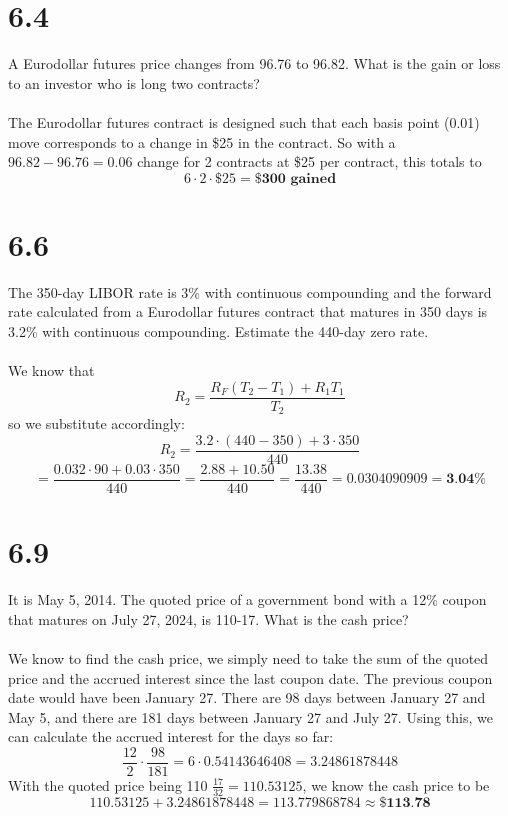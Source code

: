 \documentclass{article}
\begin{document}
\thispagestyle{firstpageheader}
{\Large 

\section*{6.4}
A Eurodollar futures price changes from 96.76 to 96.82. What is the gain or loss to an investor who is long two contracts? \\ \\
The Eurodollar futures contract is designed such that each basis point (0.01) move corresponds to a change in \$25 in the contract. So with a \(96.82 - 96.76 = 0.06\) change for 2 contracts at \$25 per contract, this totals to 
\[
  6 \cdot 2 \cdot \$25 = \boxed{\textbf{\$300 gained}}
\]

}
{\Large 

\section*{6.6}
The 350-day LIBOR rate is 3\% with continuous compounding and the forward rate calculated from a Eurodollar futures contract that matures in 350 days is 3.2\% with continuous compounding. Estimate the 440-day zero rate. \\ \\
We know that 
\[
  R_2 = \frac{R_F(T_2 - T_1) + R_1T_1}{T_2}
\]
so we substitute accordingly:
\[
  R_2 = \frac{3.2 \cdot (440 - 350) + 3 \cdot 350}{440}
\]
\[
  = \frac{0.032 \cdot 90 + 0.03 \cdot 350}{440} = \frac{2.88 + 10.50}{440} = \frac{13.38}{440} = 0.0304090909 = \boxed{\textbf{3.04\%}}
\]

}
{\Large 

\section*{6.9}
It is May 5, 2014. The quoted price of a government bond with a 12\% coupon that matures on July 27, 2024, is 110-17. What is the cash price? \\ \\
We know to find the cash price, we simply need to take the sum of the quoted price and the accrued interest since the last coupon date. The previous coupon date would have been January 27. There are 98 days between January 27 and May 5, and there are 181 days between January 27 and July 27. Using this, we can calculate the accrued interest for the days so far:
\[
  \frac{12}{2} \cdot \frac{98}{181} = 6 \cdot 0.54143646408 = 3.24861878448
\]
With the quoted price being 110 \(\frac{17}{32} = 110.53125\), we know the cash price to be 
\[
  110.53125 + 3.24861878448 = 113.779868784 \approx \boxed{\textbf{\$113.78}}
\]

}
\end{document}
